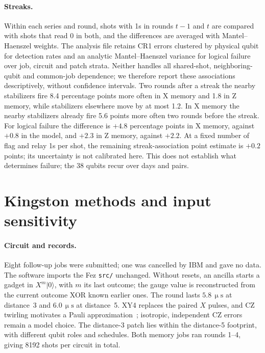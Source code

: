\documentclass[aps,pra,reprint,nofootinbib,longbibliography,floatfix,showkeys]{revtex4-2}
\newcommand{\ket}[1]{\lvert #1\rangle}
\newcommand{\us}{\,\upmu\mathrm{s}}
\begin{document}
\paragraph*{Streaks.}
Within each series and round, shots with 1s in rounds $t-1$ and $t$ are compared with shots that read 0 in both, and the differences are averaged with Mantel--Haenszel weights.
The analysis file retains CR1 errors clustered by physical qubit for detection rates and an analytic Mantel--Haenszel variance for logical failure over job, circuit and patch strata.
Neither handles all shared-shot, neighboring-qubit and common-job dependence; we therefore report these associations descriptively, without confidence intervals.
Two rounds after a streak the nearby stabilizers fire 8.4 percentage points more often in X memory and 1.8 in Z memory, while stabilizers elsewhere move by at most 1.2.
In X memory the nearby stabilizers already fire 5.6 points more often two rounds before the streak.
For logical failure the difference is $+4.8$ percentage points in X memory, against $+0.8$ in the model, and $+2.3$ in Z memory, against $+2.2$.
At a fixed number of flag and relay 1s per shot, the remaining streak-association point estimate is $+0.2$ points; its uncertainty is not calibrated here.
This does not establish what determines failure; the 38 qubits recur over days and pairs.

\section{Kingston methods and input sensitivity}
\label{app:kingston}

\paragraph*{Circuit and records.}
Eight follow-up jobs were submitted; one was cancelled by IBM and gave no data.
The software imports the Fez \texttt{src/} unchanged.
Without resets, an ancilla starts a gadget in $X^m\ket{0}$, with $m$ its last outcome; the gauge value is reconstructed from the current outcome XOR known earlier ones.
The round lasts $5.8\us$ at distance~3 and $6.0\us$ at distance~5.
XY4 replaces the paired $X$ pulses, and CZ twirling motivates a Pauli approximation~\cite{wallman2016noise}; isotropic, independent CZ errors remain a model choice.
The distance-3 patch lies within the distance-5 footprint, with different qubit roles and schedules.
Both memory jobs ran rounds 1--4, giving 8192 shots per circuit in total.
\end{document}
